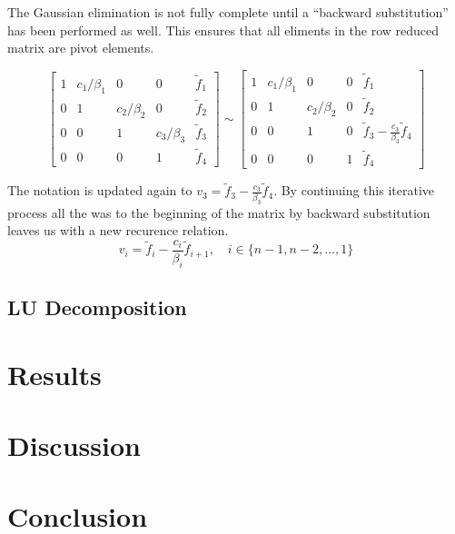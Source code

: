 \documentclass[10pt, a4paper]{amsart}
\begin{document}
The Gaussian elimination is not fully complete until a ``backward
substitution'' has been performed as well. This ensures that all
eliments in the row reduced matrix are pivot elements. 

\begin{equation}
\left[
\begin{array}{cccc|c}
1 & c_1/\beta_1 & 0 & 0 & \tilde{f}_1 \\
0 & 1 & c_2/\beta_2 & 0  & \tilde{f}_2 \\
0 & 0 & 1 & c_3/\beta_3 & \tilde{f}_3 \\
0 & 0 & 0 & 1 & \tilde{f}_4
\end{array}
\right] \sim
\left[
\begin{array}{cccc|c}
1 & c_1/\beta_1 & 0 & 0 & \tilde{f}_1 \\
0 & 1 & c_2/\beta_2 & 0  & \tilde{f}_2 \\
0 & 0 & 1 & 0 & \tilde{f}_3 -\frac{c_3}{\beta_3}\tilde{f}_4 \\
0 & 0 & 0 & 1 & \tilde{f}_4
\end{array}
\right]
\end{equation}

The notation is updated again to $v_3 =\tilde{f}_3 -
\frac{c_3}{\beta_3}\tilde{f}_4$. By continuing this iterative process
all the was to the beginning of the matrix by backward substitution
leaves us with a new recurence relation.
\begin{equation}
v_i=\tilde{f}_i - \frac{c_i}{\beta_i}\tilde{f}_{i+1}, \quad i \in \{n-1,n-2,\dots,1\}
\end{equation}

\subsection{LU Decomposition}

\section{Results}

\section{Discussion}

\section{Conclusion}

\begin{thebibliography}{10}
\end{thebibliography}
\end{document}
